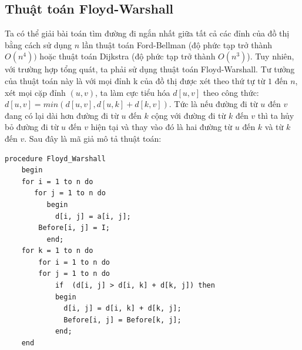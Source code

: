 \documentclass[a4paper,12pt]{report}
\begin{document}

\subsection{Thuật toán Floyd-Warshall}
	Ta có thể giải bài toán tìm đường đi ngắn nhất giữa tất cả các đỉnh của đồ thị bằng cách sử dụng  $n$ lần thuật toán Ford-Bellman (độ phức tạp trở thành $ O(n^{4})) $ hoặc thuật toán Dijkstra (độ phức tạp trở thành $ O(n^{3}) $). Tuy nhiên, với trường hợp tổng quát, ta phải sử dụng thuật toán Floyd-Warshall.
Tư tưởng của thuật toán này là với mọi đỉnh k của đồ thị được xét theo thứ tự từ $1$ đến $n$, xét mọi cặp đỉnh $ (u, v) $, ta làm cực tiểu hóa $ d[u, v] $ theo công thức: $ d[u, v] = min(d[u, v], d[u,k] + d[k, v]) $. Tức là nếu đường đi từ $u$ đến $v$ đang có lại dài hơn đường đi từ $u$ đến $k$ cộng với đường đi từ $k$ đến $v$ thì ta hủy bỏ đường đi từ $u$ đến $v$ hiện tại và thay vào đó là hai đường từ $u$ đến $k$ và từ $k$ đến $v$.
Sau đây là mã giả mô tả thuật toán:\\
\begin{verbatim}
procedure Floyd_Warshall
    begin
	for i = 1 to n do
	   for j = 1 to n do
	      begin
	        d[i, j] = a[i, j];
		Before[i, j] = I;
	      end;
	for k = 1 to n do
	    for i = 1 to n do
		for j = 1 to n do
		    if  (d[i, j] > d[i, k] + d[k, j]) then
			begin
			  d[i, j] = d[i, k] + d[k, j];
			  Before[i, j] = Before[k, j];
			end;
    end
\end{verbatim}
\end{document}
